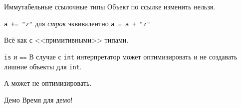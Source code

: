 \begin{frame}[t,fragile]{Иммутабельные ссылочные типы}
	Объект по ссылке изменить нельзя.
	
	\verb~a += "z"~ для \textit{строк} эквивалентно \verb~a = a + "z"~

	Всё как с <<примитивными>> типами.
\end{frame}

\begin{frame}[t]{\texttt{is} и \texttt{==}}
	В случае с \texttt{int} интерпретатор может оптимизировать и не создавать
	лишние объекты для \texttt{int}.
	
	А может не оптимизировать.
\end{frame}

\begin{frame}[t]{Демо}
	Время для демо!
\end{frame}
